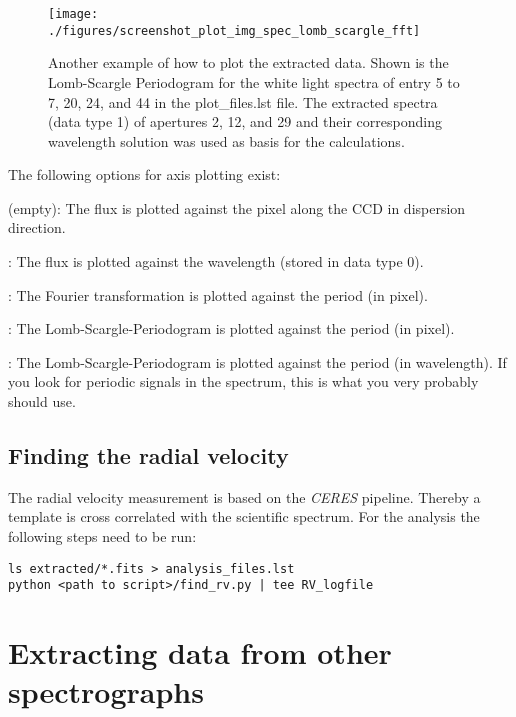 \documentclass[10pt,a4paper]{article}
\begin{document}
\begin{figure} 
  \begin{center}
    \texttt{[image: ./figures/screenshot\_plot\_img\_spec\_lomb\_scargle\_fft]}
  \end{center} 
  \caption{Another example of how to plot the extracted data. Shown is the Lomb-Scargle Periodogram for the white light spectra of entry 5 to 7, 20, 24, and 44 in the plot\_files.lst file. The extracted spectra (data type 1) of apertures 2, 12, and 29 and their corresponding wavelength solution was used as basis for the calculations.
    \label{figure_plotting_results_example2}}
\end{figure}

The following options for axis plotting exist:
\begin{description}\setlength\itemsep{0em}
  \item [] (empty): The flux is plotted against the pixel along the CCD in dispersion direction.
  \item [w] : The flux is plotted against the wavelength (stored in data type 0).
  \item [f] : The Fourier transformation is plotted against the period (in pixel). 
  \item [l] : The Lomb-Scargle-Periodogram is plotted against the period (in pixel).
  \item [wl] : The Lomb-Scargle-Periodogram is plotted against the period (in wavelength). If you look for periodic signals in the spectrum, this is what you very probably should use. 
\end{description}


\subsection{Finding the radial velocity }

\noindent The radial velocity measurement is based on the \textit{CERES} pipeline. Thereby a template is cross correlated with the scientific spectrum. For the analysis the following steps need to be run:
\begin{lstlisting}[style=base]
ls extracted/*.fits > analysis_files.lst
python <path to script>/find_rv.py | tee RV_logfile
\end{lstlisting}


\newpage

\section{Extracting data from other spectrographs}
\end{document}
